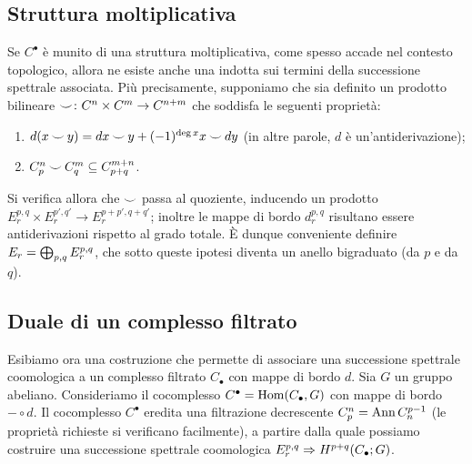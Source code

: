 \subsection{Struttura moltiplicativa}\label{cohomological-spectral-sequence:multiplicative-structure}
Se \(C^\bullet\) è munito di una struttura moltiplicativa, come spesso accade nel contesto topologico, allora ne esiste anche una indotta sui termini della successione spettrale associata. Più precisamente, supponiamo che sia definito un prodotto bilineare \(\map{\cupp}{C^n\times C^m}{C^{n+m}}\) che soddisfa le seguenti proprietà:
\begin{enumerate}
\item \(d(x\mathbin{\smile} y)=dx\mathbin{\smile} y+(-1)^{\deg x}x\mathbin{\smile} dy\) (in altre parole, \(d\) è un'antiderivazione);
\item \(C^n_p\mathbin{\smile} C^m_q\subseteq C^{m+n}_{p+q}\).
\end{enumerate}
Si verifica allora che \(\mathbin{\smile}\) passa al quoziente, inducendo un prodotto \(E^{p,q}_r\times E^{p',q'}_r\to E^{p+p',q+q'}_r\); inoltre le mappe di bordo \(d^{p,q}_r\) risultano essere antiderivazioni rispetto al grado totale. È dunque conveniente definire \(E_r=\bigoplus_{p,q}E^{p,q}_r\), che sotto queste ipotesi diventa un anello bigraduato (da \(p\) e da \(q\)).

\subsection{Duale di un complesso filtrato}\label{cohomological-spectral-sequence:dual-complex}
Esibiamo ora una costruzione che permette di associare una successione spettrale coomologica a un complesso filtrato \(C_\bullet\) con mappe di bordo \(d\). Sia \(G\) un gruppo abeliano. Consideriamo il cocomplesso \(C^\bullet=\operatorname{Hom}(C_\bullet,G)\) con mappe di bordo \(-\circ d\). Il cocomplesso \(C^\bullet\) eredita una filtrazione decrescente \(C^n_p=\operatorname{Ann} C_n^{p-1}\) (le proprietà richieste si verificano facilmente), a partire dalla quale possiamo costruire una successione spettrale coomologica \(E^{p,q}_r\Rightarrow H^{p+q}(C_\bullet;G)\).

